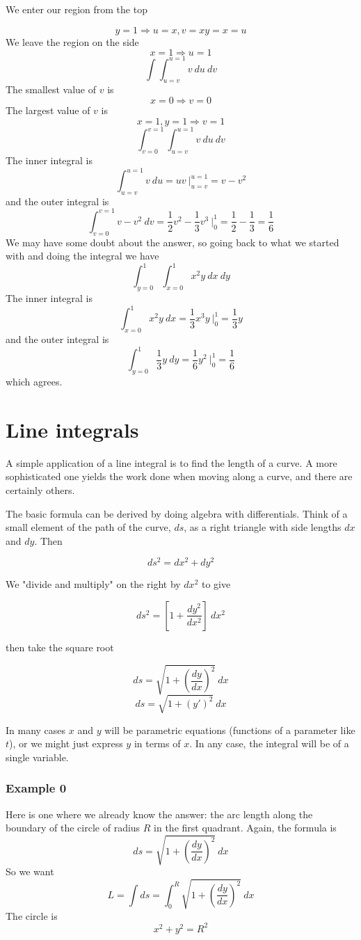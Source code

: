 \documentclass[11pt, oneside]{report}   	%
\begin{document}
We enter our region from the top

\[ y= 1 \Longrightarrow u = x, v = xy = x = u \]
We leave the region on the side
\[ x= 1 \Longrightarrow u = 1 \]
\[ \int \int_{u=v}^{u=1} v \ du \ dv \]
The smallest value of $v$ is 
\[ x = 0 \Longrightarrow v = 0 \]
The largest value of $v$ is 
\[ x = 1, y = 1 \Longrightarrow v = 1 \]
\[ \int_{v=0}^{v=1} \int_{u=v}^{u=1} v \ du \ dv \]
The inner integral is 
\[ \int_{u=v}^{u=1} v \ du = uv \ \bigg |_{u=v}^{u=1} = v - v^2 \]
and the outer integral is
\[ \int_{v=0}^{v=1} v - v^2 \ dv = \frac{1}{2}v^2 - \frac{1}{3}v^3 \ \bigg |_{0}^{1} = \frac{1}{2} - \frac{1}{3} = \frac{1}{6} \]
We may have some doubt about the answer, so going back to what we started with and doing the integral we have
\[ \int_{y=0}^1 \int_{x=0}^1 x^2 y \ dx \ dy \]
The inner integral is 
\[ \int_{x=0}^1 x^2 y \ dx = \frac{1}{3}x^3y \ \bigg |_{0}^{1} = \frac{1}{3}y  \]
and the outer integral is
\[ \int_{y=0}^1  \frac{1}{3}y \ dy = \frac{1}{6}y^2 \ \bigg |_{0}^{1} = \frac{1}{6}  \]
which agrees.

\chapter{Line integrals}

A simple application of a line integral is to find the length of a curve.  A more sophisticated one yields the work done when moving along a curve, and there are certainly others.

The basic formula can be derived by doing algebra with differentials.  Think of a small element of the path of the curve, $ds$, as a right triangle with side lengths $dx$ and $dy$.  Then

\[ ds^2 = dx^2 + dy^2 \]

We "divide and multiply" on the right by $dx^2$ to give

\[ ds^2 = [1 + \frac{dy^2}{dx^2}] \ dx^2 \]

then take the square root

\[ ds = \sqrt{1 + (\frac{dy}{dx})^2} \ dx \]
\[ ds = \sqrt{1 + (y')^2} \ dx \]

In many cases $x$ and $y$ will be parametric equations (functions of a parameter like $t$), or we might just express $y$ in terms of $x$.  In any case, the integral will be of a single variable.
\subsection*{Example 0}
Here is one where we already know the answer:  the arc length along the boundary of the circle of radius $R$ in the first quadrant.  Again, the formula is
\[ ds = \sqrt{1 + (\frac{dy}{dx})^2} \ dx \]
So we want
\[ L = \int ds = \int_0^R  \sqrt{1 + (\frac{dy}{dx})^2} \ dx \]
The circle is
\[ x^2 + y^2 = R^2 \]
\end{document}
